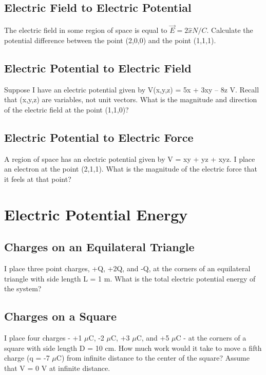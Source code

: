 \documentclass[11pt]{article}
\begin{document}
\subsection{Electric Field to Electric Potential}
The electric field in some region of space is equal to $\vec{E} = 2 \hat{x} N/C$.  Calculate the potential difference between the point (2,0,0) and the point (1,1,1).

\subsection{Electric Potential to Electric Field}
Suppose I have an electric potential given by V(x,y,z) = 5x + 3xy – 8z V.  Recall that (x,y,z) are variables, not unit vectors.  What is the magnitude and direction of the electric field at the point (1,1,0)?

\subsection{Electric Potential to Electric Force}
A region of space has an electric potential given by V = xy + yz + xyz.  I place an electron at the point (2,1,1).  What is the magnitude of the electric force that it feels at that point?


\pagebreak
\section{Electric Potential Energy}

\subsection{Charges on an Equilateral Triangle}
I place three point charges, +Q, +2Q, and -Q, at the corners of an equilateral triangle with side length L = 1 m.  What is the total electric potential energy of the system?

\subsection{Charges on a Square}
I place four charges - +1 $\mu$C, -2 $\mu$C, +3 $\mu$C, and +5 $\mu$C - at the corners of a square with side length D = 10 cm.  How much work would it take to move a fifth charge (q = -7 $\mu$C) from infinite distance to the center of the square?  Assume that V = 0 V at infinite distance.
\end{document}
